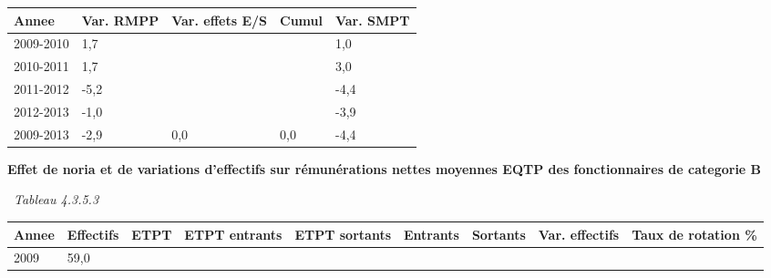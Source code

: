 \begin{longtable}[]{@{}lllll@{}}
\toprule
Annee & Var. RMPP & Var. effets E/S & Cumul & Var. SMPT\tabularnewline
\midrule
\endhead
2009-2010 & 1,7 & & & 1,0\tabularnewline
2010-2011 & 1,7 & & & 3,0\tabularnewline
2011-2012 & -5,2 & & & -4,4\tabularnewline
2012-2013 & -1,0 & & & -3,9\tabularnewline
2009-2013 & -2,9 & 0,0 & 0,0 & -4,4\tabularnewline
\bottomrule
\end{longtable}

\textbf{Effet de noria et de variations d'effectifs sur rémunérations
nettes moyennes EQTP des fonctionnaires de categorie B}

~\emph{Tableau 4.3.5.3}

\begin{longtable}[]{@{}lllllllll@{}}
\toprule
\begin{minipage}[b]{0.05\columnwidth}\raggedright
Annee\strut
\end{minipage} & \begin{minipage}[b]{0.08\columnwidth}\raggedright
Effectifs\strut
\end{minipage} & \begin{minipage}[b]{0.04\columnwidth}\raggedright
ETPT\strut
\end{minipage} & \begin{minipage}[b]{0.10\columnwidth}\raggedright
ETPT entrants\strut
\end{minipage} & \begin{minipage}[b]{0.10\columnwidth}\raggedright
ETPT sortants\strut
\end{minipage} & \begin{minipage}[b]{0.07\columnwidth}\raggedright
Entrants\strut
\end{minipage} & \begin{minipage}[b]{0.07\columnwidth}\raggedright
Sortants\strut
\end{minipage} & \begin{minipage}[b]{0.11\columnwidth}\raggedright
Var. effectifs\strut
\end{minipage} & \begin{minipage}[b]{0.14\columnwidth}\raggedright
Taux de rotation \%\strut
\end{minipage}\tabularnewline
\midrule
\endhead
\begin{minipage}[t]{0.05\columnwidth}\raggedright
2009\strut
\end{minipage} & \begin{minipage}[t]{0.08\columnwidth}\raggedright
59,0\strut
\end{minipage} & \begin{minipage}[t]{0.04\columnwidth}\raggedright

\end{minipage}
\end{longtable}
